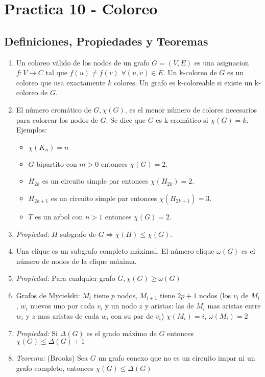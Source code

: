 \section{Practica 10 - Coloreo}
\subsection{Definiciones, Propiedades y Teoremas}
\begin{enumerate}
\item Un coloreo válido de los nodos de un grafo $G=(V,E)$ es una asignacion $f:V\rightarrow C$ tal que $f(u) \neq f(v)$ $\forall(u,v)\in E$. Un k-coloreo de $G$ es un coloreo que usa exactamente $k$ colores. Un grafo es k-coloreable si existe un k-coloreo de $G$.
\item El número cromático de $G, \chi(G)$, es el menor número de colores necesarios para colorear los nodos de $G$. Se dice que $G$ es k-cromático si $\chi(G) = k$. Ejemplos:
    \begin{itemize}
        \item $\chi(K_{n}) = n$
        \item $G$ bipartito con $m>0$ entonces $\chi(G) = 2$.
        \item $H_{2k}$ es un circuito simple par entonces $\chi(H_{2k}) = 2$.
        \item $H_{2k+1}$ es un circuito simple par entonces $\chi(H_{2k+1}) = 3$.
        \item $T$ es un arbol con $n>1$ entonces $\chi(G) = 2$.
    \end{itemize}
\item \textit{Propiedad:} $H$ subgrafo de $G \Rightarrow \chi(H) \leq \chi(G)$.
\item Una clique es un subgrafo completo máximal. El número clique $\omega(G)$ es el número de nodos de la clique máxima.
\item \textit{Propiedad:} Para cualquier grafo $G, \chi(G) \geq \omega(G)$
\item Grafos de Mycielski: $M_{i}$ tiene $p$ nodos, $M_{i+1}$ tiene $2p+1$ nodos (los $v_{i}$ de $M_{i}$, $w_{i}$ nuevos uno por cada $v_{i}$ y un nodo $z$ y aristas: las de $M_{i}$ mas aristas entre $w_{i}$ y $z$ mas aristas de cada $w_{i}$ con su par de $v_{i}$) $\chi(M_{i})=i$, $\omega(M_{i})=2$
\item \textit{Propiedad:} Si $\Delta(G)$ es el grado máximo de $G$ entonces $\chi(G) \leq \Delta(G)+1$
\item \textit{Teorema:} (Brooks) Sea $G$ un grafo conexo que no es un circuito impar ni un grafo completo, entonces $\chi(G) \leq \Delta(G)$

\end{enumerate}
